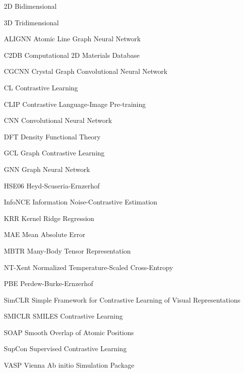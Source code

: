 \documentclass[	12pt, Times, openright, twoside, a4paper, english, brazil]{abntex2}
\begin{document}
\begin{siglas}
  \item[2D] Bidimensional
  \item[3D] Tridimensional
  \item[ALIGNN] Atomic Line Graph Neural Network
  \item[C2DB] Computational 2D Materials Database
  \item[CGCNN] Crystal Graph Convolutional Neural Network
  \item[CL] Contrastive Learning
  \item[CLIP] Contrastive Language-Image Pre-training
  \item[CNN] Convolutional Neural Network
  \item[DFT] Density Functional Theory
  \item[GCL] Graph Contrastive Learning
  \item[GNN] Graph Neural Network
  \item[HSE06] Heyd-Scuseria-Ernzerhof
  \item[InfoNCE] Information Noise-Contrastive Estimation
  \item[KRR] Kernel Ridge Regression
  \item[MAE] Mean Absolute Error
  \item[MBTR] Many-Body Tensor Representation
  \item[NT-Xent] Normalized Temperature-Scaled Cross-Entropy
  \item[PBE] Perdew-Burke-Ernzerhof
  \item[SimCLR] Simple Framework for Contrastive Learning of Visual Representations
  \item[SMICLR] SMILES Contrastive Learning
  \item[SOAP] Smooth Overlap of Atomic Positions
  \item[SupCon] Supervised Contrastive Learning
  \item[VASP] Vienna Ab initio Simulation Package
\end{siglas}

\end{document}
